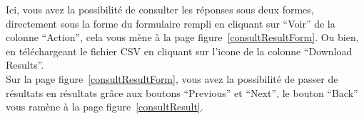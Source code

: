 \documentclass[a4paper,11pt,final]{report}
\begin{document}
\noindent\begin{minipage}{\linewidth}%
\label{consultResult}
\end{minipage}

Ici, vous avez la possibilité de consulter les réponses sous deux formes, directement sous la forme du formulaire rempli en cliquant sur ``Voir'' de la colonne ``Action'', cela vous mène à la page figure~\ref{consultResultForm}. Ou bien, en téléchargeant le fichier CSV en cliquant sur l'icone de la colonne ``Download Results''.\\
Sur la page figure~\ref{consultResultForm}, vous avez la possibilité de passer de résultats en résultats grâce aux boutons ``Previous'' et ``Next'', le bouton ``Back'' vous ramène à la page figure~\ref{consultResult}.

\noindent\begin{minipage}{\linewidth}%
\label{consultResultForm}
\end{minipage}
\end{document}
